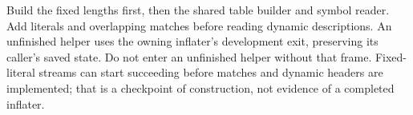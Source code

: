 Build the fixed lengths first, then the shared table builder and symbol reader. Add
literals and overlapping matches before reading dynamic descriptions. An unfinished
helper uses the owning inflater's development exit, preserving its caller's saved
state. Do not enter an unfinished helper without that frame. Fixed-literal streams
can start succeeding before matches and dynamic headers are implemented; that is a
checkpoint of construction, not evidence of a completed inflater.
